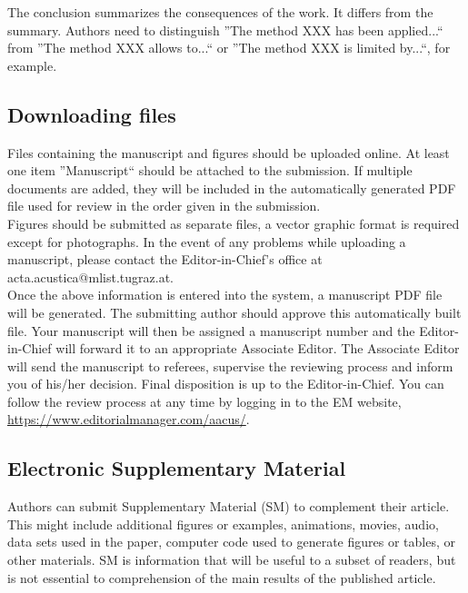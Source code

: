 The conclusion summarizes the consequences of the work. It differs
from the summary. Authors need to distinguish \textquotedblright The
method XXX has been applied...\textquotedblleft{} from \textquotedblright The
method XXX allows to...\textquotedblleft{} or \textquotedblright The
method XXX is limited by...\textquotedblleft , for example.

\subsection{Downloading files }

Files containing the manuscript and figures should be uploaded online.
At least one item \textquotedblright Manuscript\textquotedblleft{}
should be attached to the submission. If multiple documents are added,
they will be included in the automatically generated PDF file used
for review in the order given in the submission.\\

Figures should be submitted as separate files, a vector graphic format
is required except for photographs. In the event of any problems while
uploading a manuscript, please contact the Editor-in-Chief's office
at acta.acustica@mlist.tugraz.at.\\

Once the above information is entered into the system, a manuscript
PDF file will be generated. The submitting author should approve this
automatically built file. Your manuscript will then be assigned a
manuscript number and the Editor-in-Chief will forward it to an appropriate
Associate Editor. The Associate Editor will send the manuscript to
referees, supervise the reviewing process and inform you of his/her
decision. Final disposition is up to the Editor-in-Chief. You can
follow the review process at any time by logging in to the EM website,
\href{https://www.editorialmanager.com/aacus/}{https://www.editorialmanager.com/aacus/}.

\subsection{Electronic Supplementary Material }

Authors can submit Supplementary Material (SM) to complement their
article. This might include additional figures or examples, animations,
movies, audio, data sets used in the paper, computer code used to
generate figures or tables, or other materials. SM is information
that will be useful to a subset of readers, but is not essential to
comprehension of the main results of the published article.\\


